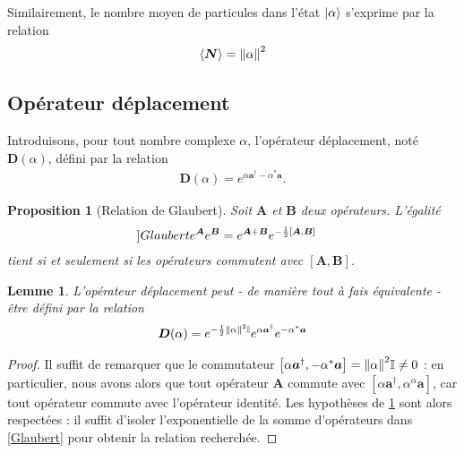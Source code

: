 \documentclass[11pt,oneside,a4paper]{article}
\newtheorem{lemma}[theorem]{Lemme}
\newtheorem{property}[theorem]{Proposition}
\begin{document}
Similairement, le nombre moyen de particules dans l'état $\ket{\alpha}$ s'exprime par la relation
\begin{align}
  \expval{\bm{N}} = \norm{\alpha}^2\label{eq:mean N}
\end{align}

\subsection{Opérateur déplacement} \label{opérateur déplacement}
Introduisons, pour tout nombre complexe $\alpha$, l'opérateur déplacement, noté $\bm{D}(\alpha)$, défini par la relation
\begin{align}
  \label{eq:operateur deplacement}
  \bm{D}(\alpha) = e^{\alpha \bm{a}^\dagger-\alpha^*\bm{a}}.
\end{align}

\begin{property}[Relation de Glaubert]
  \label{prop Glaubert}
  Soit $\bm{A}$ et $\bm{B}$ deux opérateurs. L'égalité
  \begin{align}
    \label[]{Glaubert}
    e^{\bm{A}}e^{\bm{B}} &= e^{\bm{A}+\bm{B}}e^{-\frac{1}{2}\left[\bm{A},\bm{B}\right]}
  \end{align}
  tient si et seulement si les opérateurs commutent avec $\left[\bm{A},\bm{B}\right]$.
\end{property}

\begin{lemma}
  \label{lemme displacement}
  L'opérateur déplacement peut - de manière tout à fais équivalente - être défini par la relation
  \begin{align}
    \bm{D}(\alpha) = e^{-\frac{1}{2}\norm{\alpha}^2\mathbb{I}}e^{\alpha\bm{a}^\dagger}e^{-\alpha^*\bm{a}}
  \end{align}
\end{lemma}
\begin{proof}
  Il suffit de remarquer que le commutateur $\left[\alpha\bm{a}^\dagger,-\alpha^*\bm{a}\right] = \norm{\alpha}^2\mathbb{I} \neq 0$ : en particulier, nous avons alors que tout opérateur $\bm{A}$ commute avec $\left[\alpha\bm{a}^\dagger,\alpha^\alpha\bm{a}\right]$, car tout opérateur commute avec l'opérateur identité. Les hypothèses de \ref{prop Glaubert} sont alors respectées : il suffit d'isoler l'exponentielle de la somme d'opérateurs dans \eqref{Glaubert} pour obtenir la relation recherchée.
\end{proof}
\end{document}
